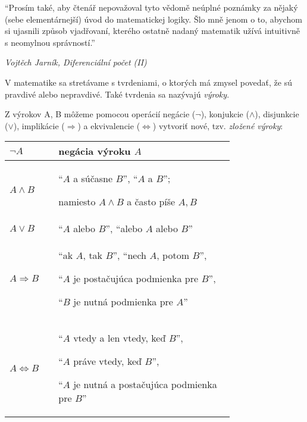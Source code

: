 \epigraph{
  \enquote{Prosím také, aby čtenář nepovažoval tyto vědomě neúplné poznámky za
nějaký (sebe elementárnejší) úvod do matematickej logiky. Šlo mně jenom o to,
abychom si ujasnili způsob vjadřovaní, kterého ostatně nadaný matematik užívá
intuitivně s neomylnou správností.}
}{\textit{Vojtěch Jarník, Diferenciální počet (II)}}

V matematike sa stretávame s tvrdeniami, o ktorých má
zmysel povedať, že sú pravdivé alebo nepravdivé. Také tvrdenia sa nazývajú
\emph{výroky}.

Z výrokov A, B môžeme pomocou operácií negácie ($\neg$), konjukcie
($\land$), disjunkcie ($\lor$), implikácie ($\Rightarrow$) a ekvivalencie
($\iff$) vytvoriť nové, tzv. \emph{zložené výroky}:

\begin{center}
  \begin{tabular}{|m{0.15\linewidth} | p{0.6\linewidth}|}
    \hline
    $\neg A$ & negácia výroku $A$ \\
    \hline
    \bigskip
    $A \land B$
      & \enquote{$A$ a súčasne $B$},
        \enquote{$A$ a $B$};

        namiesto $A \land B$ a často píše $A, B$ \\
    \hline
    \bigskip
    $A \lor B$
      & \enquote{$A$ alebo $B$},
        \enquote{alebo $A$ alebo $B$} \\
    \hline
    \bigskip
    $A \Rightarrow B$
      & \enquote{ak $A$, tak $B$},
        \enquote{nech $A$, potom $B$},

        \enquote{$A$ je postačujúca podmienka pre $B$},

        \enquote{$B$ je nutná podmienka pre $A$} \\
    \hline
    \bigskip
    $A \iff B$
      & \enquote{$A$ vtedy a len vtedy, keď $B$},

        \enquote{$A$ práve vtedy, keď $B$},

        \enquote{$A$ je nutná a postačujúca podmienka pre $B$} \\
    \hline
  \end{tabular}
\end{center}

